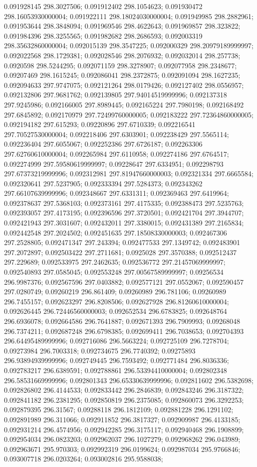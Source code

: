 0.091928145 298.3027506; 0.091912402 298.1054623; 0.091930472 298.16053930000004; 0.091922111 298.18024030000004; 0.091949985 298.2882961; 0.091953644 298.3848094; 0.091969546 298.4622643; 0.091969857 298.323822; 0.091984396 298.3255565; 0.091982682 298.2686593; 0.092003319 298.35632860000004; 0.092015139 298.3547225; 0.092000329 298.20979189999997; 0.092022568 298.1729381; 0.092028546 298.2076932; 0.092032014 298.257738; 0.0920598 298.5244295; 0.092071159 298.3278907; 0.092077958 298.2348677; 0.09207469 298.1615245; 0.092086041 298.2372875; 0.092091094 298.1627235; 0.092094633 297.9747075; 0.092121264 298.0179426; 0.092127402 298.0556957; 0.092132806 297.9681762; 0.092139805 297.94014519999996; 0.092137318 297.9245986; 0.092166005 297.8989445; 0.092165224 297.7980198; 0.092168492 297.6845892; 0.092170979 297.72499760000005; 0.092183222 297.72364860000005; 0.092194182 297.615293; 0.09220896 297.6710339; 0.092216541 297.70527530000004; 0.092218406 297.6303901; 0.092238429 297.5565114; 0.092236404 297.6055067; 0.092252386 297.6726187; 0.092263306 297.62760610000004; 0.092265984 297.6110958; 0.092274186 297.6764517; 0.092274999 297.59580619999997; 0.09228647 297.6334951; 0.092298793 297.67373219999996; 0.092312981 297.81947660000003; 0.092321334 297.6665584; 0.092320641 297.5237905; 0.092333394 297.5284373; 0.092343262 297.66107639999996; 0.092348667 297.6331311; 0.092369463 297.6419964; 0.092378637 297.5368103; 0.092373161 297.4175335; 0.092388473 297.5235763; 0.092393057 297.4173195; 0.092396596 297.3720501; 0.092421704 297.3944707; 0.092421943 297.3031607; 0.092432011 297.3380015; 0.092431389 297.2165834; 0.092442548 297.2024502; 0.092451635 297.18508330000003; 0.092467306 297.2528805; 0.092471347 297.243394; 0.092477533 297.1349742; 0.092483901 297.2072897; 0.092503422 297.2711681; 0.0925028 297.3570388; 0.092512437 297.229689; 0.092533975 297.2462635; 0.092536772 297.21457069999997; 0.092540893 297.0585045; 0.092553248 297.00567589999997; 0.09256534 296.9987376; 0.092567596 297.0403882; 0.092577121 297.0552067; 0.092590457 297.0280749; 0.09260219 296.861409; 0.09260989 296.781106; 0.09260989 296.7455157; 0.092623297 296.8208506; 0.092627928 296.81260610000004; 0.092626445 296.72446560000003; 0.092652534 296.6783825; 0.092648764 296.6936078; 0.092664586 296.7641887; 0.092671393 296.7909993; 0.09268048 296.7374211; 0.092687248 296.6798385; 0.092699411 296.7038653; 0.092704393 296.64495489999996; 0.092716086 296.5663224; 0.092725109 296.7278704; 0.09273984 296.7003318; 0.092734675 296.7740392; 0.09275893 296.93894939999996; 0.092749445 296.7593492; 0.092771484 296.8036336; 0.092783217 296.6389591; 0.092788861 296.53394410000004; 0.092802348 296.58531669999996; 0.092801343 296.65330639999996; 0.092811602 296.5382698; 0.092826802 296.4144533; 0.092833442 296.2846839; 0.092843246 296.3187322; 0.092841182 296.2381295; 0.092850819 296.2375085; 0.092860073 296.3292253; 0.092879395 296.31567; 0.09288118 296.1812109; 0.092881228 296.1291102; 0.092891989 296.311066; 0.092911852 296.3817327; 0.092909987 296.4133185; 0.092931214 296.4574956; 0.092942285 296.3175117; 0.092940468 296.1908899; 0.092954034 296.0823203; 0.092962037 296.1027279; 0.092968262 296.043989; 0.092963671 295.970303; 0.092992319 296.0199624; 0.092987034 295.9766846; 0.093007718 296.0203264; 0.093002816 295.9588038; 